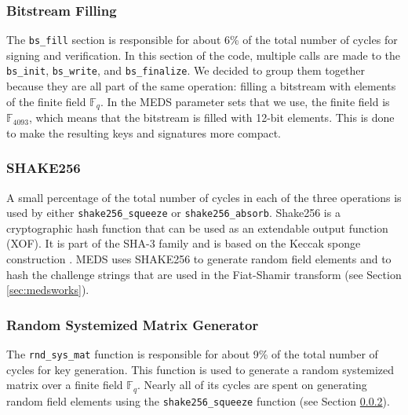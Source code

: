 \documentclass[11pt,a4paper]{report}
\theoremstyle{definition}
\begin{document}
\subsubsection{Bitstream Filling}
The \texttt{bs\_fill} section is responsible for about 6\% of the total number of cycles for signing and verification. In this section of the code, multiple calls are made to the \texttt{bs\_init}, \texttt{bs\_write}, and \texttt{bs\_finalize}. We decided to group them together because they are all part of the same operation: filling a bitstream with elements of the finite field $\mathbb{F}_q$. In the MEDS parameter sets that we use, the finite field is $\mathbb{F}_{4093}$, which means that the bitstream is filled with 12-bit elements. This is done to make the resulting keys and signatures more compact.

\subsubsection{SHAKE256}
\label{sec:shake256}
A small percentage of the total number of cycles in each of the three operations is used by either \texttt{shake256\_squeeze} or \texttt{shake256\_absorb}. Shake256 is a cryptographic hash function that can be used as an extendable output function (XOF). It is part of the SHA-3 family \cite{dworkin2015sha} and is based on the Keccak sponge construction \cite{bertoni2013keccak}. MEDS uses SHAKE256 to generate random field elements and to hash the challenge strings that are used in the Fiat-Shamir transform (see Section \ref{sec:medsworks}).

\subsubsection{Random Systemized Matrix Generator}
The \texttt{rnd\_sys\_mat} function is responsible for about 9\% of the total number of cycles for key generation. This function is used to generate a random systemized matrix over a finite field $\mathbb{F}_q$. Nearly all of its cycles are spent on generating random field elements using the \texttt{shake256\_squeeze} function (see Section \ref{sec:shake256}).
\end{document}
